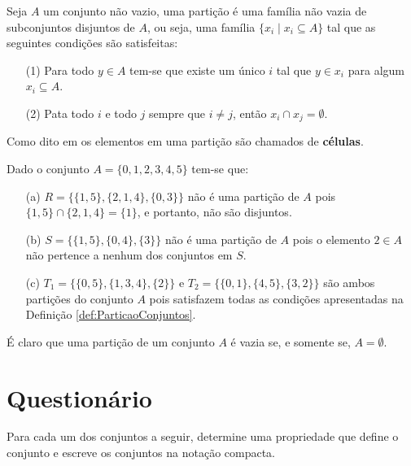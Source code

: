 \begin{definition}[Partição]\label{def:ParticaoConjuntos}
	Seja $A$ um conjunto não vazio, uma partição é uma família não vazia de subconjuntos disjuntos de $A$, ou seja, uma família $\{x_i \mid x_i \subseteq A\}$ tal que as seguintes condições são satisfeitas:
	\begin{itemize}
		\item[(1)] Para todo $y \in A$ tem-se que existe um único $i$ tal que $y \in x_i$ para algum $x_i \subseteq A$.
		\item[(2)] Pata todo $i$ e todo $j$ sempre que $i \neq j$, então $x_i \cap x_j = \emptyset$.
	\end{itemize}
\end{definition} 

Como dito em \cite{lipschutz2013-MD} os elementos em uma partição são chamados de \textbf{células}.

\begin{exem}
	Dado o conjunto $A = \{0, 1, 2, 3, 4, 5\}$ tem-se que:
	\begin{itemize}
		\item[(a)] $R = \{\{1, 5\}, \{2, 1, 4\}, \{0, 3\}\}$ não é uma partição de $A$ pois $\{1, 5\} \cap \{2, 1, 4\} = \{1\}$, e portanto, não são disjuntos.
		\item[(b)] $S = \{\{1, 5\}, \{0, 4\}, \{3\}\}$ não é uma partição de $A$ pois o elemento $2 \in A$ não pertence a nenhum dos conjuntos em $S$.
		\item[(c)] $T_1 = \{\{0, 5\}, \{1, 3, 4\}, \{2\}\}$ e $T_2 = \{\{0, 1\}, \{4, 5\}, \{3, 2\}\}$ são ambos partições do conjunto $A$ pois satisfazem todas as condições apresentadas na Definição \ref{def:ParticaoConjuntos}.
	\end{itemize}
\end{exem}

\begin{rema}
	É claro que uma partição de um conjunto $A$ é vazia se, e somente se, $A = \emptyset$.
\end{rema}

\section{Questionário}

\begin{exercise}\label{exerc:Conjuntos0}
	Para cada um dos conjuntos a seguir, determine uma propriedade que define o conjunto e escreve os conjuntos na notação compacta.
\end{exercise}

